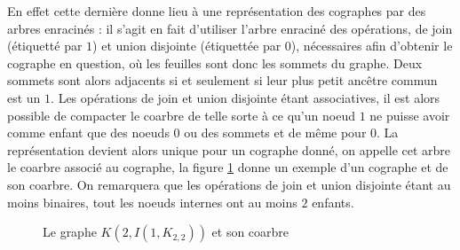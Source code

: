 \documentclass{scrartcl}
\begin{document}
\begin{flushleft}
En effet cette dernière donne lieu à une représentation des cographes par des arbres enracinés : il s'agit en fait d'utiliser l'arbre
enraciné des opérations, de join (étiquetté par $1$) et union disjointe (étiquettée par $0$), nécessaires afin d'obtenir le cographe en question,
où les feuilles sont donc les sommets du graphe. Deux sommets sont alors adjacents si et seulement si leur plus petit ancêtre commun est un $1$.
Les opérations de join et union disjointe étant associatives, il est alors possible de compacter le coarbre de telle sorte à ce qu'un noeud
$1$ ne puisse avoir comme enfant que des noeuds $0$ ou des sommets et de même pour $0$. La représentation devient alors unique pour un cographe
donné, on appelle cet arbre le coarbre associé au cographe, la figure \ref{excographe} donne un exemple d'un cographe et de son coarbre.
On remarquera que les opérations de join et union disjointe étant au moins binaires, tout les noeuds internes ont au moins $2$ enfants. 

\begin{figure}[h]
    \caption{Le graphe $K(2,I(1,K_{2,2}))$ et son coarbre}\label{excographe}
    \vspace*{0.5cm}
    \begin{center}
\end{center}
\end{figure}
\end{flushleft}
\end{document}
